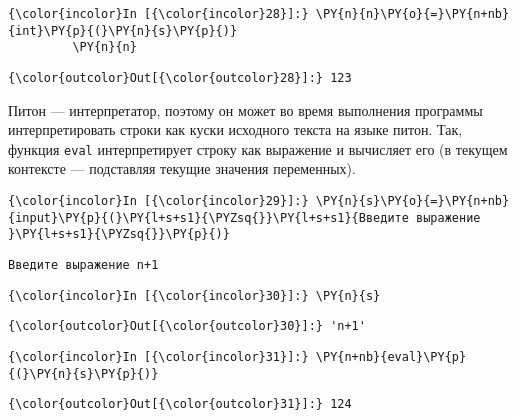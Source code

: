     \begin{Verbatim}[commandchars=\\\{\}]
{\color{incolor}In [{\color{incolor}28}]:} \PY{n}{n}\PY{o}{=}\PY{n+nb}{int}\PY{p}{(}\PY{n}{s}\PY{p}{)}
         \PY{n}{n}
\end{Verbatim}

            \begin{Verbatim}[commandchars=\\\{\}]
{\color{outcolor}Out[{\color{outcolor}28}]:} 123
\end{Verbatim}
        
    Питон --- интерпретатор, поэтому он может во время выполнения программы
интерпретировать строки как куски исходного текста на языке питон. Так,
функция \texttt{eval} интерпретирует строку как выражение и вычисляет
его (в текущем контексте --- подставляя текущие значения переменных).

    \begin{Verbatim}[commandchars=\\\{\}]
{\color{incolor}In [{\color{incolor}29}]:} \PY{n}{s}\PY{o}{=}\PY{n+nb}{input}\PY{p}{(}\PY{l+s+s1}{\PYZsq{}}\PY{l+s+s1}{Введите выражение }\PY{l+s+s1}{\PYZsq{}}\PY{p}{)}
\end{Verbatim}

    \begin{Verbatim}[commandchars=\\\{\}]
Введите выражение n+1

    \end{Verbatim}

    \begin{Verbatim}[commandchars=\\\{\}]
{\color{incolor}In [{\color{incolor}30}]:} \PY{n}{s}
\end{Verbatim}

            \begin{Verbatim}[commandchars=\\\{\}]
{\color{outcolor}Out[{\color{outcolor}30}]:} 'n+1'
\end{Verbatim}
        
    \begin{Verbatim}[commandchars=\\\{\}]
{\color{incolor}In [{\color{incolor}31}]:} \PY{n+nb}{eval}\PY{p}{(}\PY{n}{s}\PY{p}{)}
\end{Verbatim}

            \begin{Verbatim}[commandchars=\\\{\}]
{\color{outcolor}Out[{\color{outcolor}31}]:} 124
\end{Verbatim}
        
